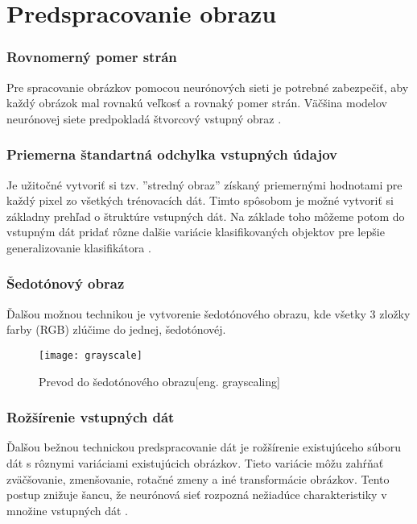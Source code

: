 
\section{Predspracovanie obrazu}


\subsubsection{Rovnomerný pomer strán}
Pre spracovanie obrázkov pomocou neurónových sieti je potrebné zabezpečiť, aby každý obrázok mal rovnakú veľkosť a rovnaký pomer strán.
Väčšina modelov neurónovej siete predpokladá štvorcový vstupný obraz \cite{odkaz:NNPreprocessing}.

\subsubsection{Priemerna štandartná odchylka vstupných údajov}
Je užitočné vytvoriť si tzv. ''stredný obraz'' získaný priemernými hodnotami pre každý pixel zo všetkých trénovacích dát.
Timto spôsobom je možné vytvoriť si základny prehľad o štruktúre vstupných dát.
Na základe toho môžeme potom do vstupným dát pridať rôzne dalšie variácie klasifikovaných objektov pre lepšie generalizovanie klasifikátora \cite{odkaz:NNPreprocessing}.

\subsubsection{Šedotónový obraz}
Ďalšou možnou technikou je vytvorenie šedotónového obrazu, kde všetky 3 zložky farby (RGB) zlúčime do jednej, šedotónovéj.
\begin{figure}[H]
	\centering
	\texttt{[image: grayscale]}
	\caption{Prevod do šedotónového obrazu[eng. grayscaling]\cite{odkaz:NNPreprocessing}}
	\label{pic:GrayScaling}
\end{figure}

\subsubsection{Rožšírenie vstupných dát}
Ďalšou bežnou technickou predspracovanie dát je rožšírenie existujúceho súboru dát s rôznymi variáciami existujúcich obrázkov.
Tieto variácie môžu zahŕňať zväčšovanie, zmenšovanie, rotačné zmeny a iné transformácie obrázkov.
Tento postup znižuje šancu, že neurónová sieť rozpozná nežiadúce charakteristiky v množine vstupných dát \cite{odkaz:NNPreprocessing}.
